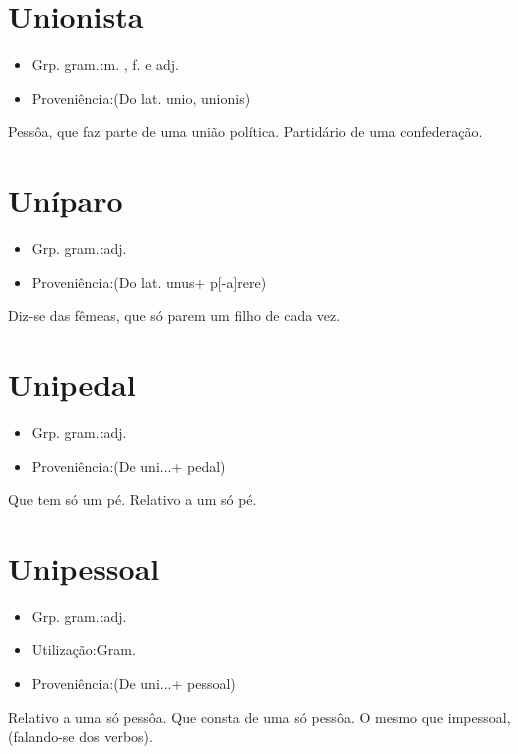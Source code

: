 \documentclass{article}
\begin{document}
\section{Unionista}
\begin{itemize}
\item {Grp. gram.:m. ,  f.  e  adj.}
\end{itemize}
\begin{itemize}
\item {Proveniência:(Do lat. \textunderscore unio\textunderscore , \textunderscore unionis\textunderscore )}
\end{itemize}
Pessôa, que faz parte de uma união política.
Partidário de uma confederação.
\section{Uníparo}
\begin{itemize}
\item {Grp. gram.:adj.}
\end{itemize}
\begin{itemize}
\item {Proveniência:(Do lat. \textunderscore unus\textunderscore  + \textunderscore p[-a]rere\textunderscore )}
\end{itemize}
Diz-se das fêmeas, que só parem um filho de cada vez.
\section{Unipedal}
\begin{itemize}
\item {Grp. gram.:adj.}
\end{itemize}
\begin{itemize}
\item {Proveniência:(De \textunderscore uni...\textunderscore  + \textunderscore pedal\textunderscore )}
\end{itemize}
Que tem só um pé.
Relativo a um só pé.
\section{Unipessoal}
\begin{itemize}
\item {Grp. gram.:adj.}
\end{itemize}
\begin{itemize}
\item {Utilização:Gram.}
\end{itemize}
\begin{itemize}
\item {Proveniência:(De \textunderscore uni...\textunderscore  + \textunderscore pessoal\textunderscore )}
\end{itemize}
Relativo a uma só pessôa.
Que consta de uma só pessôa.
O mesmo que \textunderscore impessoal\textunderscore , (falando-se dos verbos).
\end{document}
